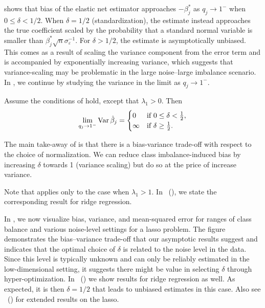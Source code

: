  shows that bias of the elastic net estimator approaches
\(-\beta_j^*\) as \(q_j \rightarrow 1^-\) when \(0 \leq \delta < 1/2\). When \(\delta =
1/2\) (standardization), the estimate instead approaches the true coefficient scaled by the
probability that a standard normal variable is smaller than
\(\beta_j^*\sqrt{n}\sigma_\varepsilon^{-1}\). For \(\delta > 1/2\), the estimate is
asymptotically unbiased. This comes as a result of scaling the variance component from the
error term and is accompanied by exponentially increasing variance, which suggests that
variance-scaling may be problematic in the large noise--large imbalance scenario. In
, we continue by studying the variance in the limit as
\(q_j \rightarrow 1^-\).

\begin{theorem}
  \label{thm:classbalance-variance}
  Assume the conditions of  hold, except that
  \(\lambda_1 > 0\). Then
  \[
    \lim_{q_j \rightarrow 1^-} \operatorname{Var} \hat{\beta}_j =
    \begin{cases}
      0      & \text{if } 0 \leq \delta < \frac{1}{2}, \\
      \infty & \text{if } \delta \geq \frac{1}{2}.
    \end{cases}
  \]
\end{theorem}

The main take-away of  is that there
is a bias-variance trade-off with respect to the choice of normalization. We can reduce
class imbalance-induced bias by increasing \(\delta\) towards 1 (variance scaling) but do
so at the price of increase variance.

Note that  applies only to the case when \(\lambda_1 > 1\).
In ~(), we state the corresponding result
for ridge regression.

In , we now visualize bias, variance, and mean-squared
error for ranges of class balance and various noise-level settings for a lasso problem. The
figure demonstrates the bias--variance trade-off that our asymptotic results suggest and
indicates that the optimal choice of \(\delta\) is related to the noise level in the data.
Since this level is typically unknown and can only be reliably estimated in the
low-dimensional setting, it suggests there might be value in selecting \(\delta\) through
hyper-optimization. In
~() we show
results for ridge regression as well. As expected, it is then \(\delta = 1/2\) that leads
to unbiased estimates in this case. Also see
~() for extended
results on the lasso.

